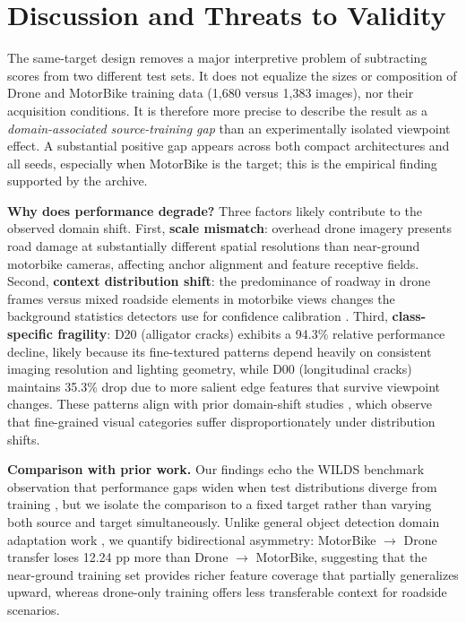 \documentclass[conference,a4paper]{IEEEtran}
\begin{document}
\section{Discussion and Threats to Validity}
The same-target design removes a major interpretive problem of subtracting scores from two different test sets. It does not equalize the sizes or composition of Drone and MotorBike training data (1,680 versus 1,383 images), nor their acquisition conditions. It is therefore more precise to describe the result as a \emph{domain-associated source-training gap} than an experimentally isolated viewpoint effect. A substantial positive gap appears across both compact architectures and all seeds, especially when MotorBike is the target; this is the empirical finding supported by the archive.

\textbf{Why does performance degrade?} Three factors likely contribute to the observed domain shift. First, \textbf{scale mismatch}: overhead drone imagery presents road damage at substantially different spatial resolutions than near-ground motorbike cameras, affecting anchor alignment and feature receptive fields. Second, \textbf{context distribution shift}: the predominance of roadway in drone frames versus mixed roadside elements in motorbike views changes the background statistics detectors use for confidence calibration \cite{lin2014coco}. Third, \textbf{class-specific fragility}: D20 (alligator cracks) exhibits a 94.3\% relative performance decline, likely because its fine-textured patterns depend heavily on consistent imaging resolution and lighting geometry, while D00 (longitudinal cracks) maintains 35.3\% drop due to more salient edge features that survive viewpoint changes. These patterns align with prior domain-shift studies \cite{koh2021wilds}, which observe that fine-grained visual categories suffer disproportionately under distribution shifts.

\textbf{Comparison with prior work.} Our findings echo the WILDS benchmark observation that performance gaps widen when test distributions diverge from training \cite{koh2021wilds}, but we isolate the comparison to a fixed target rather than varying both source and target simultaneously. Unlike general object detection domain adaptation work \cite{lin2014coco}, we quantify bidirectional asymmetry: MotorBike $\to$ Drone transfer loses 12.24 pp more than Drone $\to$ MotorBike, suggesting that the near-ground training set provides richer feature coverage that partially generalizes upward, whereas drone-only training offers less transferable context for roadside scenarios.
\end{document}
